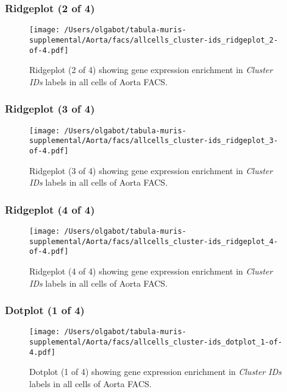 \clearpage

\subsubsection{Ridgeplot (2 of 4)}
\begin{figure}[h]
\centering
\texttt{[image: /Users/olgabot/tabula-muris-supplemental/Aorta/facs/allcells\_cluster-ids\_ridgeplot\_2-of-4.pdf]}

\caption{ Ridgeplot (2 of 4)  showing gene expression enrichment in \emph{Cluster IDs} labels in all cells of Aorta FACS. }
\end{figure}


\clearpage

\subsubsection{Ridgeplot (3 of 4)}
\begin{figure}[h]
\centering
\texttt{[image: /Users/olgabot/tabula-muris-supplemental/Aorta/facs/allcells\_cluster-ids\_ridgeplot\_3-of-4.pdf]}

\caption{ Ridgeplot (3 of 4)  showing gene expression enrichment in \emph{Cluster IDs} labels in all cells of Aorta FACS. }
\end{figure}


\clearpage

\subsubsection{Ridgeplot (4 of 4)}
\begin{figure}[h]
\centering
\texttt{[image: /Users/olgabot/tabula-muris-supplemental/Aorta/facs/allcells\_cluster-ids\_ridgeplot\_4-of-4.pdf]}

\caption{ Ridgeplot (4 of 4)  showing gene expression enrichment in \emph{Cluster IDs} labels in all cells of Aorta FACS. }
\end{figure}


\clearpage

\subsubsection{Dotplot (1 of 4)}
\begin{figure}[h]
\centering
\texttt{[image: /Users/olgabot/tabula-muris-supplemental/Aorta/facs/allcells\_cluster-ids\_dotplot\_1-of-4.pdf]}

\caption{ Dotplot (1 of 4)  showing gene expression enrichment in \emph{Cluster IDs} labels in all cells of Aorta FACS. }
\end{figure}



